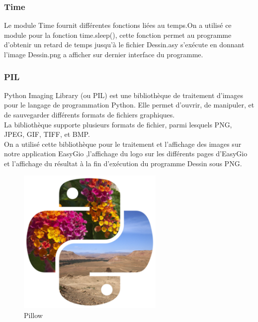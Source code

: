 \documentclass[a4paper]{report}
\begin{document}
\subsubsection{Time}
Le module Time fournit différentes fonctions liées au temps.On a utilisé ce module pour la fonction time.sleep(), cette fonction permet au programme d'obtenir un retard de temps jusqu'à le fichier Dessin.asy s'exécute en donnant l'image Dessin.png a afficher sur dernier interface du programme. 
\newpage
\subsubsection{PIL}
Python Imaging Library (ou PIL) est une bibliothèque de traitement d'images pour le langage de programmation Python. Elle permet d'ouvrir, de manipuler, et de sauvegarder différents formats de fichiers graphiques.\\
La bibliothèque supporte plusieurs formats de fichier, parmi lesquels PNG, JPEG, GIF, TIFF, et BMP.\\
On a utilisé cette bibliothèque pour le traitement et l'affichage des images sur notre application EasyGio ,l'affichage du logo sur les différents pages d'EasyGio et l'affichage du résultat à la fin d'exécution du programme Dessin sous PNG.
\begin{figure}[!h]
    \centering
    \includegraphics[width=7cm]{images/pillow-logo-248x250.png}
    \caption{Pillow}
    \label{fig:Pillow}
\end{figure}
\end{document}
